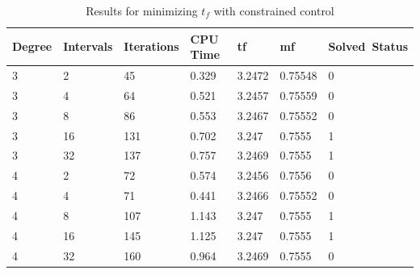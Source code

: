 \documentclass[]{article}
\begin{document}
	\begin{table}
		\begin{tabular}{lllllll}
			Degree & Intervals & Iterations & CPU Time & tf & mf & Solved\ Status \\ 
			\hline 
			3 & 2 & 45 & 0.329 & 3.2472 & 0.75548 & 0 \\ 
			3 & 4 & 64 & 0.521 & 3.2457 & 0.75559 & 0 \\ 
			3 & 8 & 86 & 0.553 & 3.2467 & 0.75552 & 0 \\ 
			3 & 16 & 131 & 0.702 & 3.247 & 0.7555 & 1 \\ 
			3 & 32 & 137 & 0.757 & 3.2469 & 0.7555 & 1 \\ 
			4 & 2 & 72 & 0.574 & 3.2456 & 0.7556 & 0 \\ 
			4 & 4 & 71 & 0.441 & 3.2466 & 0.75552 & 0 \\ 
			4 & 8 & 107 & 1.143 & 3.247 & 0.7555 & 1 \\ 
			4 & 16 & 145 & 1.125 & 3.247 & 0.7555 & 1 \\ 
			4 & 32 & 160 & 0.964 & 3.2469 & 0.7555 & 0 \\ 
			\hline 
		\end{tabular}
		\caption{Results for minimizing \(t_f\) with constrained control}
		\label{table:3}
	\end{table}
	\FloatBarrier
\end{document}
